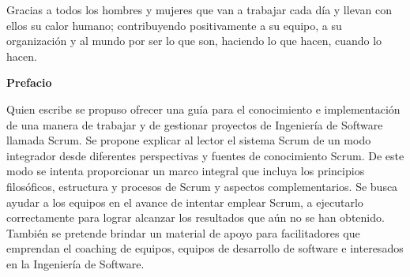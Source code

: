 
%

\newpage

\hspace{1cm}\newline %
\vspace{5cm} %

\begin{center}
Gracias a todos los hombres y mujeres que van a trabajar cada día y llevan con ellos su calor humano; contribuyendo positivamente a su equipo, a su organización y al mundo por ser lo que son, haciendo lo que hacen, cuando lo hacen.
\end{center}

\newpage
\vspace{2cm} %
\hspace{1cm}\newline %

%

\newpage

{\large \textbf{Prefacio}}

\vspace{2cm} %

Quien escribe se propuso ofrecer una guía para el conocimiento e implementación de una manera de trabajar y de gestionar proyectos de Ingeniería de Software llamada Scrum. Se propone explicar al lector el sistema Scrum de un modo integrador desde diferentes perspectivas y fuentes de conocimiento Scrum. De este modo se intenta proporcionar un marco integral que incluya los principios filosóficos, estructura y procesos de Scrum y aspectos complementarios. Se busca ayudar a los equipos en el avance de intentar emplear Scrum, a ejecutarlo correctamente para lograr alcanzar los resultados que aún no se han obtenido. También se pretende brindar un material de apoyo para facilitadores que emprendan el coaching de equipos, equipos de desarrollo de software e interesados en la Ingeniería de Software.

\newpage
\vspace{2cm} %
\hspace{1cm}\newline %
 
